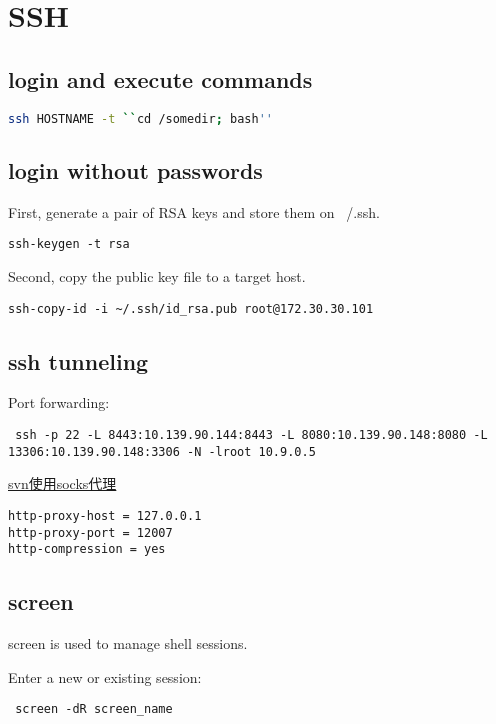 \section{SSH}

\subsection{login and execute commands}
\begin{lstlisting}[language=bash]
   ssh HOSTNAME -t ``cd /somedir; bash'' 
\end{lstlisting}

\subsection{login without passwords}

First, generate a pair of RSA keys and store them on ~/.ssh.
\begin{verbatim}
ssh-keygen -t rsa
\end{verbatim}

Second, copy the public key file to a target host.
\begin{verbatim}
ssh-copy-id -i ~/.ssh/id_rsa.pub root@172.30.30.101
\end{verbatim}


\subsection{ssh tunneling}

Port forwarding:
\begin{verbatim}
 ssh -p 22 -L 8443:10.139.90.144:8443 -L 8080:10.139.90.148:8080 -L
13306:10.139.90.148:3306 -N -lroot 10.9.0.5
\end{verbatim}

\href{http://ju.outofmemory.cn/entry/123978}{svn使用socks代理}

\begin{verbatim}
http-proxy-host = 127.0.0.1
http-proxy-port = 12007
http-compression = yes
\end{verbatim}

\subsection{screen}

screen is used to manage shell sessions.

Enter a new or existing session:

\begin{verbatim}
 screen -dR screen_name
\end{verbatim}

